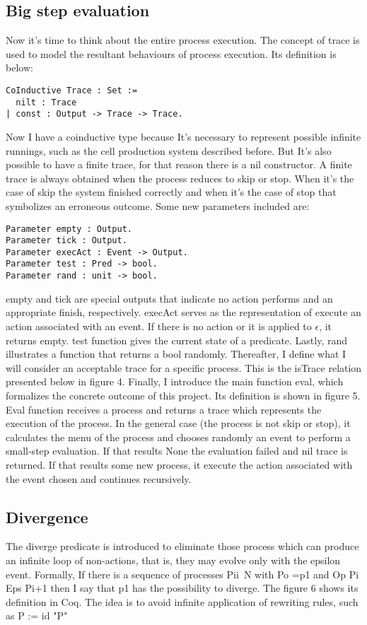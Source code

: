 \documentclass{comjnl}
\begin{document}
\subsection{Big step evaluation}
Now it's time to think about the entire process execution. The concept of trace is used to model the resultant behaviours of process execution. Its definition is below:
\begin{verbatim}
CoInductive Trace : Set :=
  nilt : Trace
| const : Output -> Trace -> Trace.
\end{verbatim}
Now I have a coinductive type because It's necessary to represent possible infinite runnings, such as the cell production system described before. But It's also possible to have a finite trace, for that reason there is a nil constructor. A finite trace is always obtained when the process reduces to skip or stop. When it's the case of skip the system finished correctly and when it's the case of stop that symbolizes an erroneous outcome.
Some new parameters included are:
\begin{verbatim}
Parameter empty : Output.
Parameter tick : Output.
Parameter execAct : Event -> Output.
Parameter test : Pred -> bool.
Parameter rand : unit -> bool.
\end{verbatim}
empty and tick are special outputs that indicate no action performs and an appropriate finish, respectively. execAct serves as the representation of execute an action associated with an event. If there is no action or it is applied to $\epsilon$, it returns empty. test function gives the current state of a predicate. Lastly, rand illustrates a function that returns a bool randomly.
Thereafter, I define what I will consider an acceptable trace for a specific process. This is the isTrace relation presented below in figure 4.
Finally, I introduce the main function eval, which formalizes the concrete outcome of this project. Its definition is shown in figure 5.
Eval function receives a process and returns a trace which represents the execution of the process. In the general case (the process is not skip or stop), it calculates the menu of the process and chooses randomly an event to perform a small-step evaluation. If that results None the evaluation failed and nil trace is returned. If that results some new process, it execute the action associated with the event chosen and continues recursively.

\subsection{Divergence}
The diverge predicate is introduced to eliminate those process which can produce an infinite loop of non-actions, that is, they may evolve only with the epsilon event. Formally, If there is a sequence of processes {Pi}i~N with Po =p1 and Op Pi Eps Pi+1 then I say that p1 has the possibility to diverge. The figure 6 shows its definition in Coq.
The idea is to avoid infinite application of rewriting rules, such as P := id "P"
\end{document}
